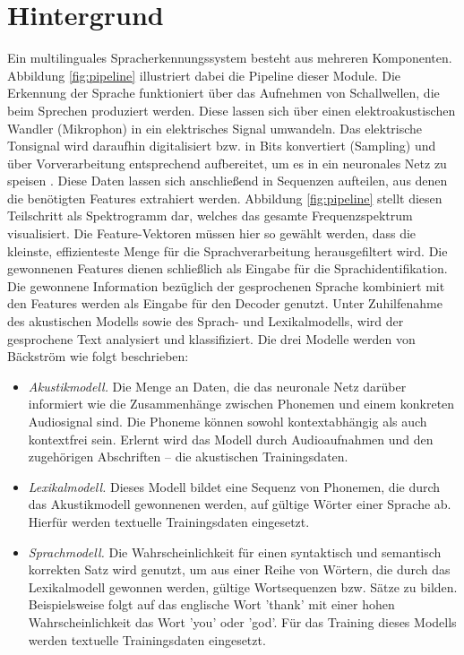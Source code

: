 \section{Hintergrund}
Ein multilinguales Spracherkennungssystem besteht aus mehreren Komponenten. Abbildung \ref{fig:pipeline} illustriert dabei die Pipeline dieser Module. Die Erkennung der Sprache funktioniert über das Aufnehmen von Schallwellen, die beim Sprechen produziert werden. Diese lassen sich über einen elektroakustischen Wandler (Mikrophon) in ein elektrisches Signal umwandeln. Das elektrische Tonsignal wird daraufhin digitalisiert bzw. in Bits konvertiert (Sampling) und über Vorverarbeitung entsprechend aufbereitet, um es in ein neuronales Netz zu speisen {\cite{beat_tobias}}. Diese Daten lassen sich anschließend in Sequenzen aufteilen, aus denen die benötigten Features extrahiert werden. Abbildung \ref{fig:pipeline} stellt diesen Teilschritt als Spektrogramm dar, welches das gesamte Frequenzspektrum visualisiert. Die Feature-Vektoren müssen hier so gewählt werden, dass die kleinste, effizienteste Menge für die Sprachverarbeitung herausgefiltert wird. Die gewonnenen Features dienen schließlich als Eingabe für die Sprachidentifikation. Die gewonnene Information bezüglich der gesprochenen Sprache kombiniert mit den Features werden als Eingabe für den Decoder genutzt. Unter Zuhilfenahme des akustischen Modells sowie des Sprach- und Lexikalmodells, wird der gesprochene Text analysiert und klassifiziert. Die drei Modelle werden von Bäckström \cite{Tom.2016} wie folgt beschrieben:

\begin{itemize}
    \item \textit{Akustikmodell.} Die Menge an Daten, die das neuronale Netz darüber informiert wie die Zusammenhänge zwischen Phonemen und einem konkreten Audiosignal sind. Die Phoneme können
    sowohl kontextabhängig als auch kontextfrei sein.
    Erlernt wird das Modell durch Audioaufnahmen und den zugehörigen Abschriften – die akustischen Trainingsdaten.
    \item \textit{Lexikalmodell.} Dieses Modell bildet eine Sequenz von Phonemen, die durch das Akustikmodell gewonnenen werden, auf gültige Wörter einer Sprache ab. Hierfür werden textuelle Trainingsdaten eingesetzt.
    \item \textit{Sprachmodell.} Die Wahrscheinlichkeit für einen syntaktisch und semantisch korrekten Satz wird genutzt, um aus einer Reihe von Wörtern, die durch das Lexikalmodell gewonnen werden, gültige Wortsequenzen bzw. Sätze zu bilden.
    Beispielsweise folgt auf das englische Wort 'thank' mit einer hohen Wahrscheinlichkeit das Wort 'you' oder
    'god'. Für das Training dieses Modells werden textuelle Trainingsdaten eingesetzt.
\end{itemize}

